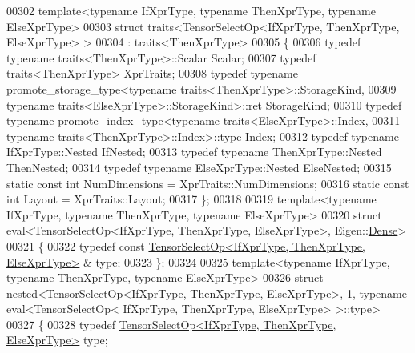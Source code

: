 \begin{DoxyCode}
00302 \textcolor{keyword}{template}<\textcolor{keyword}{typename} IfXprType, \textcolor{keyword}{typename} ThenXprType, \textcolor{keyword}{typename} ElseXprType>
00303 \textcolor{keyword}{struct }traits<TensorSelectOp<IfXprType, ThenXprType, ElseXprType> >
00304     : traits<ThenXprType>
00305 \{
00306   \textcolor{keyword}{typedef} \textcolor{keyword}{typename} traits<ThenXprType>::Scalar Scalar;
00307   \textcolor{keyword}{typedef} traits<ThenXprType> XprTraits;
00308   \textcolor{keyword}{typedef} \textcolor{keyword}{typename} promote\_storage\_type<typename traits<ThenXprType>::StorageKind,
00309                                         \textcolor{keyword}{typename} traits<ElseXprType>::StorageKind>::ret StorageKind;
00310   \textcolor{keyword}{typedef} \textcolor{keyword}{typename} promote\_index\_type<typename traits<ElseXprType>::Index,
00311                                       \textcolor{keyword}{typename} traits<ThenXprType>::Index>::type 
      \hyperlink{namespace_eigen_a62e77e0933482dafde8fe197d9a2cfde}{Index};
00312   \textcolor{keyword}{typedef} \textcolor{keyword}{typename} IfXprType::Nested IfNested;
00313   \textcolor{keyword}{typedef} \textcolor{keyword}{typename} ThenXprType::Nested ThenNested;
00314   \textcolor{keyword}{typedef} \textcolor{keyword}{typename} ElseXprType::Nested ElseNested;
00315   \textcolor{keyword}{static} \textcolor{keyword}{const} \textcolor{keywordtype}{int} NumDimensions = XprTraits::NumDimensions;
00316   \textcolor{keyword}{static} \textcolor{keyword}{const} \textcolor{keywordtype}{int} Layout = XprTraits::Layout;
00317 \};
00318 
00319 \textcolor{keyword}{template}<\textcolor{keyword}{typename} IfXprType, \textcolor{keyword}{typename} ThenXprType, \textcolor{keyword}{typename} ElseXprType>
00320 \textcolor{keyword}{struct }eval<TensorSelectOp<IfXprType, ThenXprType, ElseXprType>, Eigen::\hyperlink{struct_eigen_1_1_dense}{Dense}>
00321 \{
00322   \textcolor{keyword}{typedef} \textcolor{keyword}{const} \hyperlink{class_eigen_1_1_tensor_select_op}{TensorSelectOp<IfXprType, ThenXprType, ElseXprType>}
      & type;
00323 \};
00324 
00325 \textcolor{keyword}{template}<\textcolor{keyword}{typename} IfXprType, \textcolor{keyword}{typename} ThenXprType, \textcolor{keyword}{typename} ElseXprType>
00326 \textcolor{keyword}{struct }nested<TensorSelectOp<IfXprType, ThenXprType, ElseXprType>, 1, typename eval<TensorSelectOp<
      IfXprType, ThenXprType, ElseXprType> >::type>
00327 \{
00328   \textcolor{keyword}{typedef} \hyperlink{class_eigen_1_1_tensor_select_op}{TensorSelectOp<IfXprType, ThenXprType, ElseXprType>}
       type;

\end{DoxyCode}
